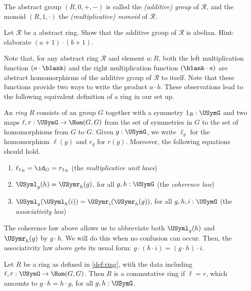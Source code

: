 The abstract group $(R,0,+,-)$ is called the \emph{(additive) group}
of $\mathscr R$, and the monoid $(R,1,\cdot)$ the 
\emph{(multiplicative) monoid} of $\mathscr R$.

\begin{xca}\label{xca:ring-group-abelian}
Let $\mathscr R$ be a abstract ring. Show that the additive group 
of $\mathscr R$ is abelian. Hint: elaborate $(a+1)\cdot(b+1)$.
\end{xca}

Note that, for any abstract ring $\mathscr R$ and element $a:R$,
both the left multiplication function $(a\cdot\blank)$ 
and the right multiplication function $(\blank\cdot a)$ 
are abstract homomorphisms of the additive group of $\mathscr R$ to itself.
Note that these functions provide two ways to write the product $a\cdot b$.
These observations lead to the following equivalent definition of a 
ring in our set up.

\begin{definition}\label{def:ring}
An \emph{ring} $R$ consists of an group $G$ together with
a symmetry $1_R : \USymG$ and two maps $\ell,r: \USymG\to\Hom(G,G)$
from the set of symmetries in $G$ to the set of homomorphisms from
$G$ to $G$.
Given $g:\USymG$, we write $\ell_g$ for the homomorphism $\ell(g)$ and 
$r_g$ for $r(g)$.
Moreover, the following equations should hold.
    \begin{enumerate}[ref=\ref{def:ring} (\alph*)]
    \item\label{ring:unit-laws} $\ell_{1_R} = \id_G = r_{1_R}$ (the \emph{multiplicative unit laws})
    \item\label{ring:lr-coherence-law} $\USyml_g(h) = \USymr_h(g)$, for all $g,h : \USymG$ (the \emph{coherence law})
        \item\label{ring:associativity-law} $\USyml_g(\USyml_h(i)) = \USymr_i(\USymr_h(g))$, for all $g,h,i : \USymG$ (the \emph{associativity law})\qedhere
    \end{enumerate}
\end{definition}
The coherence law above allows us to abbreviate both 
$\USyml_g(h)$ and $\USymr_h(g)$ by $g\cdot h$. We will do this when
no confusion can occur. Then, \eg the associativity law above
gets its usual form: $g\cdot(h\cdot i) = (g\cdot h)\cdot i$.

\begin{definition}\label{def:commutative-ring}
Let $R$ be a ring as defined in \cref{def:ring}, with the data including
$\ell,r: \USymG\to\Hom(G,G)$. Then $R$ is a commutative ring if $\ell=r$,
which amounts to $g\cdot h = h\cdot g$, for all $g,h : \USymG$. 
\end{definition}

